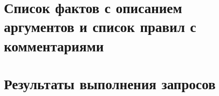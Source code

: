 \documentclass[a4paper,12pt]{article}
\begin{document}
\section*{Список фактов с описанием аргументов и список правил с комментариями}


\section*{Результаты выполнения запросов}

\end{document}
